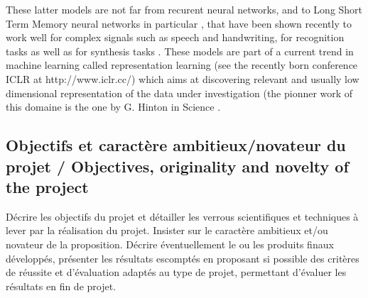 These latter models are not far from recurent neural networks, and to Long Short Term Memory neural networks in particular \cite{DBLP:conf/nips/HochreiterS96, DBLP:journals/corr/GreffSKSS15}, that have been shown recently to work well for complex signals such as speech and handwriting, for recognition tasks \cite{DBLP:conf/nips/GravesS08} as well as for synthesis tasks \cite{DBLP:journals/corr/Graves13}. These models are part of a current trend in machine  learning called representation learning (see the recently born conference ICLR at http://www.iclr.cc/) which aims at discovering relevant and usually low dimensional representation of the data under investigation (the pionner work of this domaine is the one by G. Hinton in Science \cite{DBLP:journals/cogsci/HintonOWT06}.




\nocite{*}

\subsection{Objectifs et caract\`ere ambitieux/novateur du projet / Objectives, originality and novelty of the project}
\begin{xcomment}  
D\'ecrire les objectifs du projet et d\'etailler les verrous scientifiques et techniques à lever par la r\'ealisation du projet. Insister sur le caract\`ere ambitieux et/ou novateur de la proposition.
D\'ecrire \'eventuellement le ou les produits finaux d\'evelopp\'es, pr\'esenter les r\'esultats escompt\'es en proposant si possible des crit\`eres de r\'eussite et d'\'evaluation adapt\'es au type de projet, permettant d'\'evaluer les r\'esultats en fin de projet.
\end{xcomment}  


\endinput
